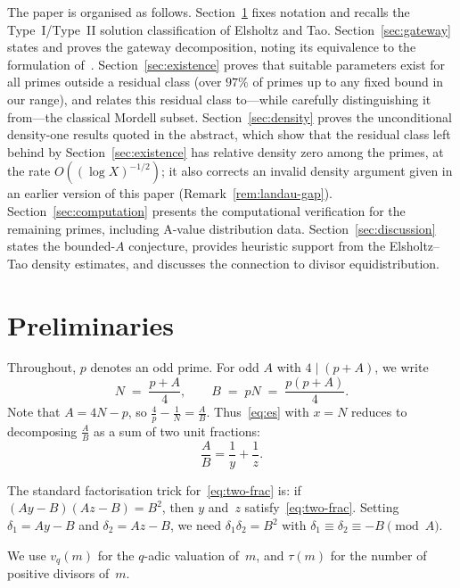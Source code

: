 \documentclass[12pt]{amsart}
\theoremstyle{definition}
\theoremstyle{remark}
\begin{document}
The paper is organised as follows.
Section~\ref{sec:prelim} fixes notation and recalls the Type~I/Type~II
solution classification of Elsholtz and Tao.
Section~\ref{sec:gateway} states and proves the gateway decomposition,
noting its equivalence to the formulation of~\cite{Vaughn2024}.
Section~\ref{sec:existence} proves that suitable parameters exist
for all primes outside a residual class
(over $97\%$ of primes up to any fixed bound in our range), and relates
this residual class to---while carefully distinguishing it from---the
classical Mordell subset.
Section~\ref{sec:density} proves the unconditional density-one results
quoted in the abstract, which show that the residual class left behind
by Section~\ref{sec:existence} has relative density zero among the
primes, at the rate $O((\log X)^{-1/2})$; it also corrects an invalid
density argument given in an earlier version of this paper
(Remark~\ref{rem:landau-gap}).
Section~\ref{sec:computation} presents the computational verification
for the remaining primes, including A-value distribution data.
Section~\ref{sec:discussion} states the bounded-$A$ conjecture,
provides heuristic support from the Elsholtz--Tao density estimates,
and discusses the connection to divisor equidistribution.

\section{Preliminaries}\label{sec:prelim}

Throughout, $p$ denotes an odd prime.
For odd $A$ with $4 \mid (p+A)$, we write
\[
  N \;=\; \frac{p+A}{4}, \qquad B \;=\; pN \;=\; \frac{p(p+A)}{4}.
\]
Note that $A = 4N - p$, so $\frac{4}{p} - \frac{1}{N} = \frac{A}{B}$.
Thus~\eqref{eq:es} with $x = N$ reduces to decomposing $\frac{A}{B}$
as a sum of two unit fractions:
\begin{equation}\label{eq:two-frac}
  \frac{A}{B} = \frac{1}{y} + \frac{1}{z}.
\end{equation}

The standard factorisation trick for~\eqref{eq:two-frac} is:
if $(Ay - B)(Az - B) = B^2$, then $y$ and~$z$ satisfy~\eqref{eq:two-frac}.
Setting $\delta_1 = Ay - B$ and $\delta_2 = Az - B$, we need
$\delta_1 \delta_2 = B^2$ with $\delta_1 \equiv \delta_2 \equiv -B \pmod{A}$.

We use $v_q(m)$ for the $q$-adic valuation of~$m$, and
$\tau(m)$ for the number of positive divisors of~$m$.
\end{document}
